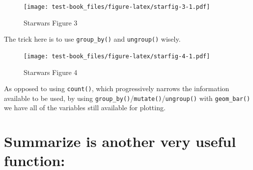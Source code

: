 \documentclass[]{book}
\newenvironment{Shaded}{\begin{snugshade}}{\end{snugshade}}
\newcommand{\DataTypeTok}[1]{\textcolor[rgb]{0.13,0.29,0.53}{#1}}
\newcommand{\DecValTok}[1]{\textcolor[rgb]{0.00,0.00,0.81}{#1}}
\newcommand{\KeywordTok}[1]{\textcolor[rgb]{0.13,0.29,0.53}{\textbf{#1}}}
\newcommand{\NormalTok}[1]{#1}
\newcommand{\OperatorTok}[1]{\textcolor[rgb]{0.81,0.36,0.00}{\textbf{#1}}}
\newcommand{\StringTok}[1]{\textcolor[rgb]{0.31,0.60,0.02}{#1}}
\begin{document}
\begin{figure}
\centering
\texttt{[image: test-book\_files/figure-latex/starfig-3-1.pdf]}
\caption{\label{fig:starfig-3}Starwars Figure 3}
\end{figure}

The trick here is to use \texttt{group\_by()} and \texttt{ungroup()} wisely.

\begin{Shaded}
\end{Shaded}

\begin{figure}
\centering
\texttt{[image: test-book\_files/figure-latex/starfig-4-1.pdf]}
\caption{\label{fig:starfig-4}Starwars Figure 4}
\end{figure}

As opposed to using \texttt{count()}, which progressively narrows the information available to be used, by using \texttt{group\_by()}/\texttt{mutate()}/\texttt{ungroup()} with \texttt{geom\_bar()} we have all of the variables still available for plotting.

\hypertarget{summarize-is-another-very-useful-function}{%
\section{Summarize is another very useful function:}\label{summarize-is-another-very-useful-function}}
\end{document}
